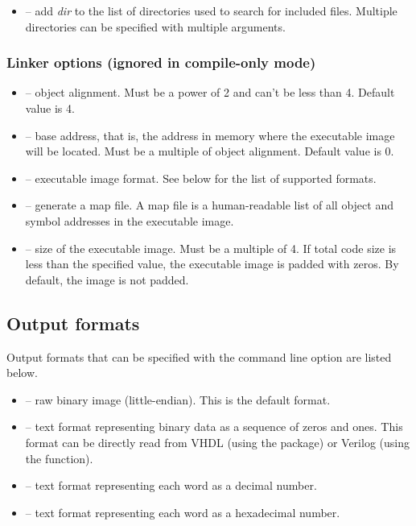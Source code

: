\documentclass[a4paper,12pt,twoside,extrafontsizes]{memoir}
\begin{document}
\begin{itemize}
	\item {} -- add \emph{dir} to the list of directories used to search for included files. Multiple directories can be specified with multiple  arguments.
\end{itemize}

\subsubsection{Linker options (ignored in compile-only mode)}

\begin{itemize}
	\item {} -- object alignment. Must be a power of 2 and can't be less than 4. Default value is 4.
	
	\item {} -- base address, that is, the address in memory where the executable image will be located. Must be a multiple of object alignment. Default value is 0.
	
	\item {} -- executable image format. See below for the list of supported formats.
	
	\item {} -- generate a map file. A map file is a human-readable list of all object and symbol addresses in the executable image.
	
	\item {} -- size of the executable image. Must be a multiple of 4. If total code size is less than the specified value, the executable image is padded with zeros. By default, the image is not padded.
\end{itemize}

\subsection{Output formats}

Output formats that can be specified with the  command line option are listed below.

\begin{itemize}
	\item {} -- raw binary image (little-endian). This is the default format.
	\item {} -- text format representing binary data as a sequence of zeros and ones. This format can be directly read from VHDL (using the  package) or Verilog\textregistered{} (using the  function).
	\item {} -- text format representing each word as a decimal number.
	\item {} -- text format representing each word as a hexadecimal number.
\end{itemize}
\end{document}
